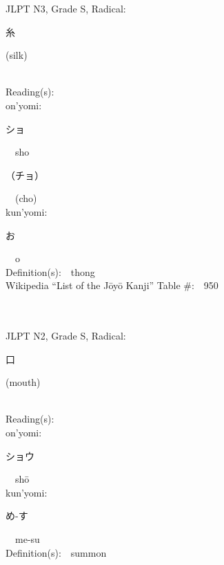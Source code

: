\begin{multicols}{2}
{JLPT N3, Grade S, Radical:\ \ {\begin{CJK}{UTF8}{min} 糸 \end{CJK}} (silk) } \\
Reading(s):\ \ \\
{\hspace*{1em}}on'yomi:\ \ \\
{\hspace*{2em}}{\begin{CJK}{UTF8}{min} ショ \end{CJK}}\ \ sho\ \ \\
{\hspace*{2em}}{\begin{CJK}{UTF8}{min} （チョ） \end{CJK}}\ \ (cho)\ \ \\
{\hspace*{1em}}kun'yomi:\ \ \\
{\hspace*{2em}}{\begin{CJK}{UTF8}{min} お \end{CJK}}\ \ o\ \ \\
Definition(s):\ \ thong \\
Wikipedia ``List of the J\=oy\=o Kanji'' Table \#:\ \ 950 \\
\ \ \\
{\fontsize{34pt}{40pt}  }\ \ \\  %
{JLPT N2, Grade S, Radical:\ \ {\begin{CJK}{UTF8}{min} 口 \end{CJK}} (mouth) } \\
Reading(s):\ \ \\
{\hspace*{1em}}on'yomi:\ \ \\
{\hspace*{2em}}{\begin{CJK}{UTF8}{min} ショウ \end{CJK}}\ \ sh\=o\ \ \\
{\hspace*{1em}}kun'yomi:\ \ \\
{\hspace*{2em}}{\begin{CJK}{UTF8}{min} め-す \end{CJK}}\ \ me-su\ \ \\
Definition(s):\ \ summon \\

\end{multicols}
